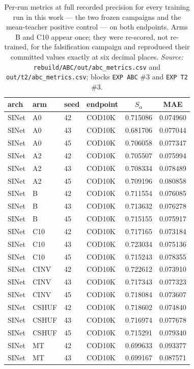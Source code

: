 \begin{table}[h]
\caption{Per-run metrics at full recorded precision for every training run in this work --- the two frozen
campaigns and the mean-teacher positive control --- on both endpoints. Arms B and C10 appear once; they were re-scored, not re-trained, for the
falsification campaign and reproduced their committed values exactly at six decimal places.
\emph{Source:} \texttt{rebuild/ABC/out/abc\_metrics.csv} and \texttt{out/t2/abc\_metrics.csv}; blocks
\texttt{EXP ABC} \#3 and \texttt{EXP T2} \#3.}
\label{tab:perrun}
\begin{center}\small
\begin{tabular}{llllcc}
\toprule
arch & arm & seed & endpoint & $S_\alpha$ & MAE \\
\midrule
SINet & A0 & 42 & COD10K & 0.715086 & 0.074960 \\
SINet & A0 & 43 & COD10K & 0.681706 & 0.077044 \\
SINet & A0 & 45 & COD10K & 0.706058 & 0.077347 \\
SINet & A2 & 42 & COD10K & 0.705507 & 0.075994 \\
SINet & A2 & 43 & COD10K & 0.708334 & 0.078489 \\
SINet & A2 & 45 & COD10K & 0.709196 & 0.080858 \\
SINet & B & 42 & COD10K & 0.711554 & 0.076085 \\
SINet & B & 43 & COD10K & 0.713632 & 0.076278 \\
SINet & B & 45 & COD10K & 0.715155 & 0.075917 \\
SINet & C10 & 42 & COD10K & 0.717165 & 0.073184 \\
SINet & C10 & 43 & COD10K & 0.723034 & 0.075136 \\
SINet & C10 & 45 & COD10K & 0.715243 & 0.078355 \\
SINet & CINV & 42 & COD10K & 0.722612 & 0.073910 \\
SINet & CINV & 43 & COD10K & 0.717343 & 0.077323 \\
SINet & CINV & 45 & COD10K & 0.718084 & 0.073607 \\
SINet & CSHUF & 42 & COD10K & 0.718602 & 0.074840 \\
SINet & CSHUF & 43 & COD10K & 0.716974 & 0.077678 \\
SINet & CSHUF & 45 & COD10K & 0.715291 & 0.079340 \\
SINet & MT & 42 & COD10K & 0.699633 & 0.093377 \\
SINet & MT & 43 & COD10K & 0.699167 & 0.087571 \\

\end{tabular}
\end{center}
\end{table}

